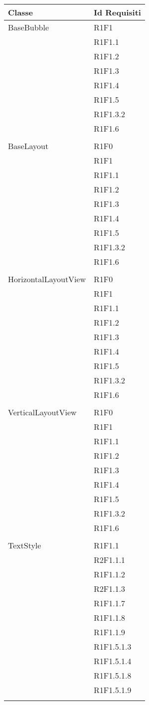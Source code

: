 \begin{center}
	\begin{longtable}{|p{7cm}|p{7cm}|}\hline
		Classe & Id Requisiti \\ \hline
		BaseBubble & R1F1 \\ & R1F1.1 \\ & R1F1.2 \\ & R1F1.3 \\ & R1F1.4 \\ & R1F1.5 \\ & R1F1.3.2 \\ & R1F1.6 \\ & \\ \hline
		BaseLayout & R1F0 \\ & R1F1 \\ & R1F1.1 \\ & R1F1.2 \\ & R1F1.3 \\ & R1F1.4 \\ & R1F1.5 \\ & R1F1.3.2 \\ & R1F1.6 \\ & \\ \hline
		HorizontalLayoutView & R1F0 \\ & R1F1 \\ & R1F1.1 \\ & R1F1.2 \\ & R1F1.3 \\ & R1F1.4 \\ & R1F1.5 \\ & R1F1.3.2 \\ & R1F1.6 \\ & \\ \hline
		VerticalLayoutView & R1F0 \\ & R1F1 \\ & R1F1.1 \\ & R1F1.2 \\ & R1F1.3 \\ & R1F1.4 \\ & R1F1.5 \\ & R1F1.3.2 \\ & R1F1.6 \\ & \\ \hline
		TextStyle & R1F1.1 \\ & R2F1.1.1 \\ & R1F1.1.2 \\ & R2F1.1.3 \\ & R1F1.1.7 \\ & R1F1.1.8 \\ & R1F1.1.9 \\ & R1F1.5.1.3 \\ & R1F1.5.1.4 \\ & R1F1.5.1.8 \\ & R1F1.5.1.9 \\ & \\ \hline

\end{longtable}
\end{center}
